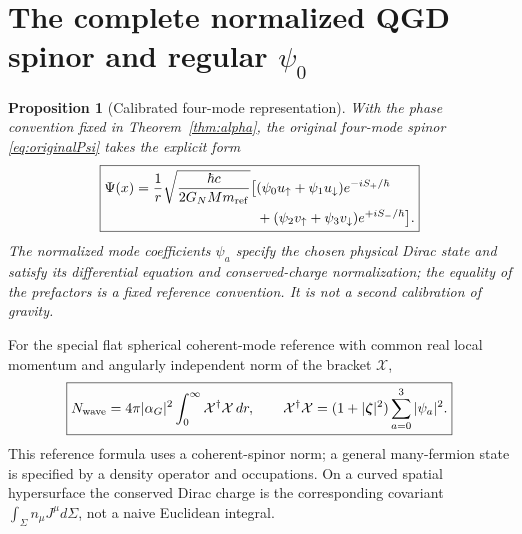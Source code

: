\documentclass[11pt,a4paper]{article}
\newtheorem{proposition}[theorem]{Proposition}
\theoremstyle{remark}
\begin{document}
\section{The complete normalized QGD spinor and regular \texorpdfstring{$\psi_0$}{psi0}}\label{sec:spinornorm}
\begin{proposition}[Calibrated four-mode representation]\label{prop:fullspinor}
With the phase convention fixed in Theorem~\ref{thm:alpha}, the original
four-mode spinor \eqref{eq:originalPsi} takes the explicit form
\begin{equation}\label{eq:spinorcal}
\boxed{\begin{aligned}
\Psi(x)=\frac{1}{r}\sqrt{\frac{\hbar c}{2G_NMm_{\rm ref}}}
\big[& (\psi_0u_\uparrow+\psi_1u_\downarrow)e^{-iS_+/\hbar}\\
&+(\psi_2v_\uparrow+\psi_3v_\downarrow)e^{+iS_-/\hbar}\big].
\end{aligned}}
\end{equation}
The normalized mode coefficients $\psi_a$ specify the chosen physical
Dirac state and satisfy its differential equation and conserved-charge
normalization; the equality of the prefactors is a fixed reference
convention. It is not a second calibration of gravity.
\end{proposition}
For the special flat spherical coherent-mode reference with common real
local momentum and angularly independent norm of the bracket $\mathcal X$,
\begin{equation}\label{eq:normflat}
\boxed{N_{\rm wave}=4\pi|\alpha_G|^2
\int_0^\infty \mathcal X^\dagger\mathcal X\,dr,\qquad
\mathcal X^\dagger\mathcal X=(1+|\boldsymbol\zeta|^2)
\sum_{a=0}^3|\psi_a|^2.}
\end{equation}
This reference formula uses a coherent-spinor norm; a general many-fermion
state is specified by a density operator and occupations. On a curved
spatial hypersurface the conserved Dirac charge is the corresponding
covariant $\int_\Sigma n_\mu J^\mu d\Sigma$, not a naive Euclidean integral.
\end{document}
